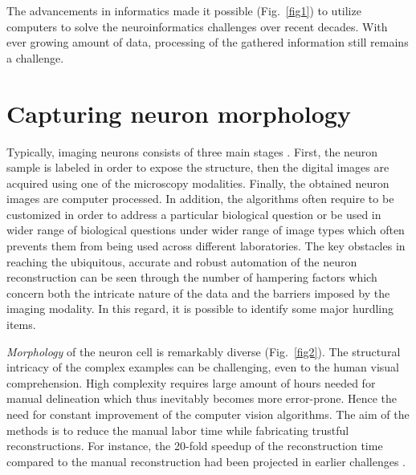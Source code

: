 The advancements in informatics made it possible (Fig.~\ref{fig1}) to utilize computers to solve the neuroinformatics challenges over recent decades. With ever growing amount of data, processing of the gathered information still remains a challenge.   

\section{Capturing neuron morphology}
\label{sec:capturing-neuron}
Typically, imaging neurons consists of three main stages \cite{peng2015bigneuron}. First, the neuron sample is labeled in order to expose the structure, then the digital images are acquired using one of the microscopy modalities. Finally, the obtained neuron images are computer processed. In addition, the algorithms often require to be customized in order to address a particular biological question or be used in wider range of biological questions under wider range of image types which often prevents them from being used across different laboratories. The key obstacles in reaching the ubiquitous, accurate and robust automation of the neuron reconstruction \cite{meijering2010neuron, donohue2011automated, acciai2016automated} can be seen through the number of hampering factors which concern both the intricate nature of the data and the barriers imposed by the imaging modality. In this regard, it is possible to identify some major hurdling items.

\textit{Morphology} of the neuron cell is remarkably diverse (Fig.~\ref{fig2}). The structural intricacy of the complex examples can be challenging, even to the human visual comprehension. High complexity requires large amount of hours needed for manual delineation which thus inevitably becomes more error-prone. Hence the need for constant improvement of the computer vision algorithms. The aim of the methods is to reduce the manual labor time while fabricating trustful reconstructions. For instance, the 20-fold speedup of the reconstruction time compared to the manual reconstruction had been projected in earlier challenges \cite{liu2011diadem}.

